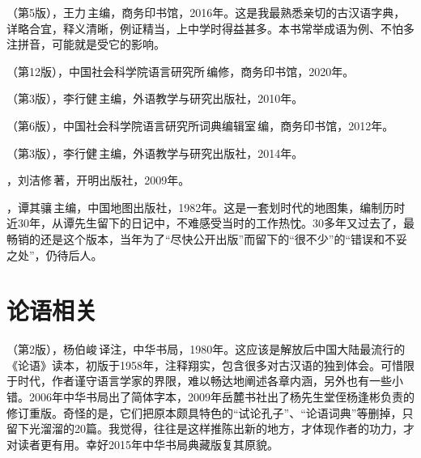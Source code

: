 
（第5版），王力\,主编，商务印书馆，2016年。这是我最熟悉亲切的古汉语字典，详略合宜，释义清晰，例证精当，上中学时得益甚多。本书常举成语为例、不怕多注拼音，可能就是受它的影响。

（第12版），中国社会科学院语言研究所\,编修，商务印书馆，2020年。

（第3版），李行健\,主编，外语教学与研究出版社，2010年。

（第6版），中国社会科学院语言研究所词典编辑室\,编，商务印书馆，2012年。

（第3版），李行健\,主编，外语教学与研究出版社，2014年。

，刘洁修\,著，开明出版社，2009年。

，谭其骧\,主编，中国地图出版社，1982年。这是一套划时代的地图集，编制历时近30年，从谭先生留下的日记中，不难感受当时的工作热忱。30多年又过去了，最畅销的还是这个版本，当年为了“尽快公开出版”而留下的“很不少”的“错误和不妥之处”，仍待后人。


\lypdfbookmark\section*{论语相关}

（第2版），杨伯峻\,译注，中华书局，1980年。这应该是解放后中国大陆最流行的《论语》读本，初版于1958年，注释翔实，包含很多对古汉语的独到体会。可惜限于时代，作者谨守语言学家的界限，难以畅达地阐述各章内涵，另外也有一些小错。2006年中华书局出了简体字本，2009年岳麓书社出了杨先生堂侄杨逢彬负责的修订重版。奇怪的是，它们把原本颇具特色的“试论孔子”、“论语词典”等删掉，只留下光溜溜的20篇。我觉得，往往是这样推陈出新的地方，才体现作者的功力，才对读者更有用。幸好2015年中华书局典藏版复其原貌。

